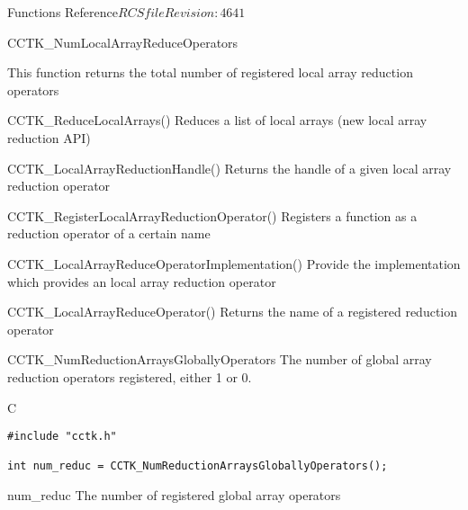 \begin{cactuspart}{ Functions Reference}{$RCSfile$}{$Revision: 4641 $}
\begin{FunctionDescription}{CCTK\_NumLocalArrayReduceOperators}
\begin{Discussion}
This function returns the total number of registered local array
reduction operators
\end{Discussion}

\begin{SeeAlsoSection}
\begin{SeeAlso}{CCTK\_ReduceLocalArrays()}
Reduces a list of local arrays (new local array reduction API)
\end{SeeAlso}

\begin{SeeAlso}{CCTK\_LocalArrayReductionHandle()}
Returns the handle of a given local array reduction operator
\end{SeeAlso}

\begin{SeeAlso}{CCTK\_RegisterLocalArrayReductionOperator()}
Registers a function as a reduction operator of a certain name
\end{SeeAlso}

\begin{SeeAlso}{CCTK\_LocalArrayReduceOperatorImplementation()}
Provide the implementation which provides an local array reduction operator
\end{SeeAlso}

\begin{SeeAlso}{CCTK\_LocalArrayReduceOperator()}
Returns the name of a registered reduction operator
\end{SeeAlso}

\end{SeeAlsoSection}
\end{FunctionDescription}

\begin{FunctionDescription}{CCTK\_NumReductionArraysGloballyOperators}
\label{CCTK-NumReductionArraysGloballyOperators}
The number of global array reduction operators registered, either 1 or 0.

\begin{SynopsisSection}
\begin{Synopsis}{C}
\begin{verbatim}
#include "cctk.h"

int num_reduc = CCTK_NumReductionArraysGloballyOperators();
\end{verbatim}
\end{Synopsis}
\end{SynopsisSection}

\begin{ResultSection}
\begin{Result}{num\_reduc}
The number of registered global array operators
\end{Result}
\end{ResultSection}


\end{FunctionDescription}
\end{cactuspart}
